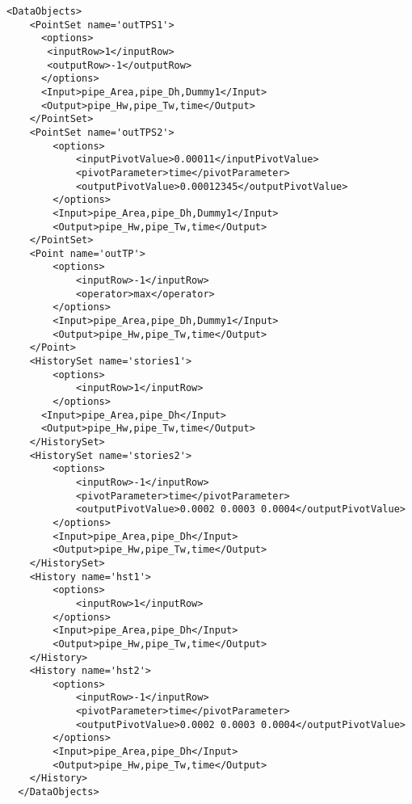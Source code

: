\begin{lstlisting}[style=XML,morekeywords={inputTs,operator,hierarchical,name,history}]
  <DataObjects>
    <PointSet name='outTPS1'>
      <options>
       <inputRow>1</inputRow>
       <outputRow>-1</outputRow>
      </options>
      <Input>pipe_Area,pipe_Dh,Dummy1</Input>
      <Output>pipe_Hw,pipe_Tw,time</Output>
    </PointSet>
    <PointSet name='outTPS2'>
        <options>
            <inputPivotValue>0.00011</inputPivotValue>
            <pivotParameter>time</pivotParameter>
            <outputPivotValue>0.00012345</outputPivotValue>
        </options>
        <Input>pipe_Area,pipe_Dh,Dummy1</Input>
        <Output>pipe_Hw,pipe_Tw,time</Output>
    </PointSet>
    <Point name='outTP'>
        <options>
            <inputRow>-1</inputRow>
            <operator>max</operator>
        </options>
        <Input>pipe_Area,pipe_Dh,Dummy1</Input>
        <Output>pipe_Hw,pipe_Tw,time</Output>
    </Point>
    <HistorySet name='stories1'>
        <options>
            <inputRow>1</inputRow>
        </options>
      <Input>pipe_Area,pipe_Dh</Input>
      <Output>pipe_Hw,pipe_Tw,time</Output>
    </HistorySet>
    <HistorySet name='stories2'>
        <options>
            <inputRow>-1</inputRow>
            <pivotParameter>time</pivotParameter>
            <outputPivotValue>0.0002 0.0003 0.0004</outputPivotValue>
        </options>
        <Input>pipe_Area,pipe_Dh</Input>
        <Output>pipe_Hw,pipe_Tw,time</Output>
    </HistorySet>
    <History name='hst1'>
        <options>
            <inputRow>1</inputRow>
        </options>
        <Input>pipe_Area,pipe_Dh</Input>
        <Output>pipe_Hw,pipe_Tw,time</Output>
    </History>
    <History name='hst2'>
        <options>
            <inputRow>-1</inputRow>
            <pivotParameter>time</pivotParameter>
            <outputPivotValue>0.0002 0.0003 0.0004</outputPivotValue>
        </options>
        <Input>pipe_Area,pipe_Dh</Input>
        <Output>pipe_Hw,pipe_Tw,time</Output>
    </History>
  </DataObjects>
\end{lstlisting}

